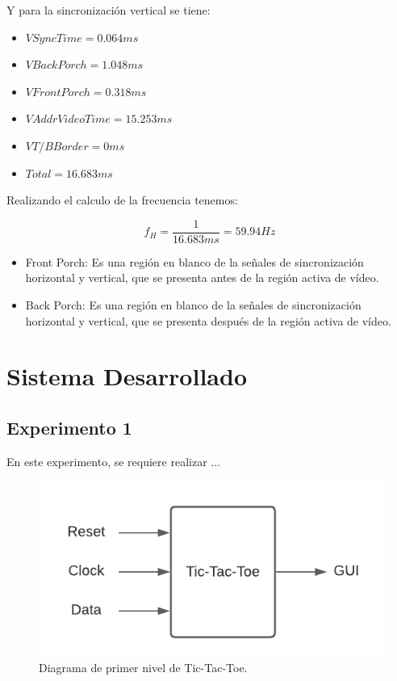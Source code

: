 \documentclass[journal,trans]{IEEEtran}
\begin{document}
	Y para la sincronización vertical se tiene: 
	\begin{itemize}
		\item $V Sync Time = 0.064 ms$
		\item $V Back Porch = 1.048 ms$
		\item $V Front Porch = 0.318 ms$
		\item $V Addr Video Time = 15.253 ms$
		\item $V T/B Border = 0 ms$
		\item $Total = 16.683 ms$
	\end{itemize}
	
	Realizando el calculo de la frecuencia tenemos:
	
	\begin{equation}
		f_{H} = \frac{1}{16.683 ms} = 59.94 Hz
	\end{equation}
	
	\begin{itemize}
		\item Front Porch: Es una región en blanco de la señales de sincronización horizontal y vertical, que se presenta antes de la región activa de vídeo.
		\item Back Porch: Es una región en blanco de la señales de sincronización horizontal y vertical, que se presenta después de la región activa de vídeo.
	\end{itemize}
	
	\section{Sistema Desarrollado}
	
	\subsection{Experimento 1}
	En este experimento, se requiere realizar ...
	
	\begin{figure}[hbtp]
		\centering
		\includegraphics[width = \columnwidth]{imagenes/PrimerN.png}
		\caption[Figura1]{Diagrama de primer nivel de Tic-Tac-Toe.}
		\label{fig:PrimerN}
	\end{figure}
	
\end{document}
